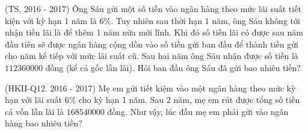 \begin{bt}%
	{(TS. 2016 - 2017)} Ông Sáu gửi một số tiền vào ngân hàng theo mức lãi suất tiết kiện với kỳ hạn 1 năm là $6\%$. Tuy nhiên sau thời hạn 1 năm, ông Sáu không tới nhận tiền lãi là để thêm 1 năm nữa mới lĩnh. Khi đó số tiền lãi có được sau năm đầu tiên sẽ được ngân hàng cộng dồn vào số tiền gửi ban đầu để thành tiền gửi cho năm kế tiếp với mức lãi suất cũ. Sau hai năm ông Sáu nhận được số tiền là $112 360 000$ đồng (kể cả gốc lẫn lãi). Hỏi ban đầu ông Sáu đã gửi bao nhiêu tiền?
\end{bt}

\begin{bt}%
	{(HKII-Q12. 2016 - 2017)} Mẹ em gửi tiết kiệm vào một ngân hàng theo mức kỳ hạn với lãi suất $6\%$ cho kỳ hạn 1 năm. Sau 2 năm, mẹ em rút được tổng số tiền cả vốn lẫn lãi là $168 540 000$ đồng. Như vậy, lúc đầu mẹ em phải gửi vào ngân hàng bao nhiêu tiền?
\end{bt}

